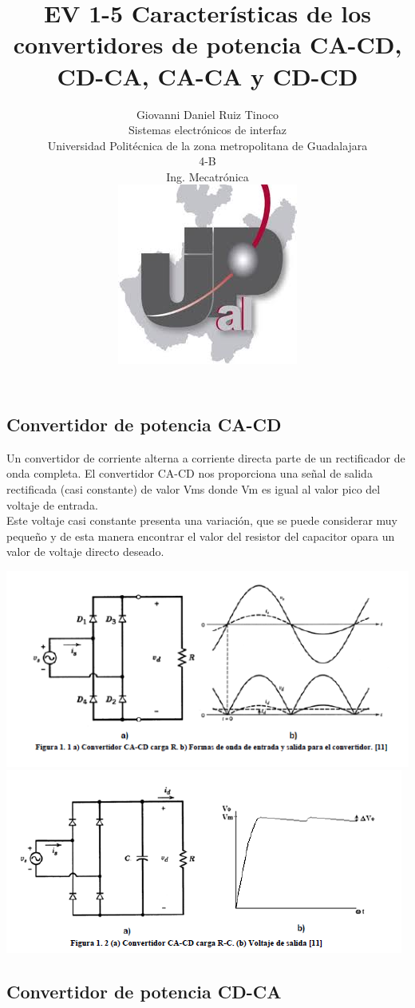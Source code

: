 \documentclass[12pt,a4paper]{article}
\title{EV 1-5 Características de los convertidores de potencia CA-CD, CD-CA, CA-CA y CD-CD}
\author{Giovanni Daniel Ruiz Tinoco\\
\small Sistemas electrónicos de interfaz\\
  \small Universidad Politécnica de la zona metropolitana de Guadalajara\\
  \small 4-B \\
  \small Ing. Mecatrónica\\
\centering
\includegraphics[scale=2]{imagenes/upz.jpg} 
}
\begin{document}
\maketitle
\newpage
\begin{center}
\section {Convertidor de potencia CA-CD}
\end{center}
Un convertidor de corriente alterna a corriente directa parte de un rectificador de onda completa.
El convertidor CA-CD nos proporciona una señal de salida rectificada (casi constante) de valor Vms donde Vm es igual al valor pico del voltaje de entrada.\\Este voltaje casi constante presenta una variación, que se puede considerar muy pequeño y de esta manera encontrar el valor del resistor del capacitor opara un valor de voltaje directo deseado.\\
\begin{center}
\includegraphics[scale=1]{imagenes/cacd.PNG} 
\includegraphics[scale=1]{imagenes/cacd2.PNG} 
\end{center}
\newpage
\begin{center}
\section {Convertidor de potencia CD-CA}
\end{center}
\end{document}
